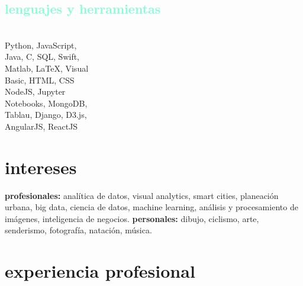 \documentclass[espanol]{cv-style}          %
\begin{document}
\begin{aside}
\section{\textcolor{aquamarine}{lenguajes y herramientas}}\\
\vspace{0.2cm}
{Python, JavaScript,\\
\vspace{0.1cm}
Java, C, SQL, Swift,\\
\vspace{0.1cm}
Matlab, \LaTeX{}, Visual\\
\vspace{0.1cm}
Basic, HTML, CSS}\\
\vspace{0.5cm}
{NodeJS, Jupyter\\
\vspace{0.1cm}
Notebooks, MongoDB,\\
\vspace{0.1cm}
Tablau, Django, D3.js,\\
\vspace{0.1cm}
AngularJS, ReactJS}\\
%
\end{aside}


\section{intereses}
  \vspace{-0.2cm}
\textbf{profesionales:} analítica de datos, visual analytics, smart cities, planeación urbana, big data, ciencia de datos, machine learning, análisis y procesamiento de imágenes, inteligencia de negocios. \textbf{personales:} dibujo, ciclismo, arte, senderismo, fotografía, natación, música.


\section{experiencia profesional}
\end{document}
